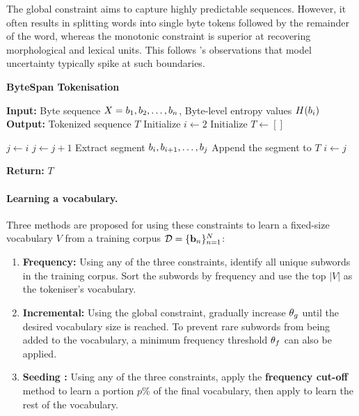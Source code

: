 
The global constraint aims to capture highly predictable sequences. However, it often results in splitting words into single byte tokens followed by the remainder of the word, whereas the monotonic constraint is superior at recovering morphological and lexical units. This follows \citet{elman-1990-finding}'s observations that model uncertainty typically spike at such boundaries.

\begin{algorithm}[t]
\caption{\textbf{ByteSpan Tokenisation}}
\begin{algorithmic}[1]
\STATE \textbf{Input:} Byte sequence $X = b_1, b_2, \dots, b_n$, Byte-level entropy values $H(b_i)$
\STATE \textbf{Output:} Tokenized sequence $T$
\STATE Initialize $i \gets 2$ 
\STATE Initialize $T \gets []$ 

    \STATE $j \gets i$
        \STATE $j \gets j + 1$
    \ENDWHILE
    \STATE Extract segment $b_i, b_{i+1}, \dots, b_{j}$
    \STATE Append the segment to $T$
    \STATE $i \gets j$
\ENDWHILE

\STATE \textbf{Return:} $T$
\end{algorithmic}
\label{alg:1}
\end{algorithm}

\paragraph{Learning a vocabulary.} Three methods are proposed for using these constraints to learn a fixed-size vocabulary \(V\) from a training corpus $\mathcal{D} = \{\mathbf{b}_n\}_{n=1}^N$:
\begin{enumerate}
    \item \textbf{Frequency:} Using any of the three constraints, identify all unique subwords in the training corpus. Sort the subwords by frequency and use the top \(|V|\) as the tokeniser's vocabulary.
    \item \textbf{Incremental:} Using the global constraint, gradually increase $\theta_g$ until the desired vocabulary size is reached. To prevent rare subwords from being added to the vocabulary, a minimum frequency threshold $\theta_f$ can also be applied.
    \item \textbf{Seeding \bpe:} Using any of the three constraints, apply the \textbf{frequency cut-off} method to learn a portion $p\%$ of the final vocabulary, then apply \bpe to learn the rest of the vocabulary. 
\end{enumerate}

